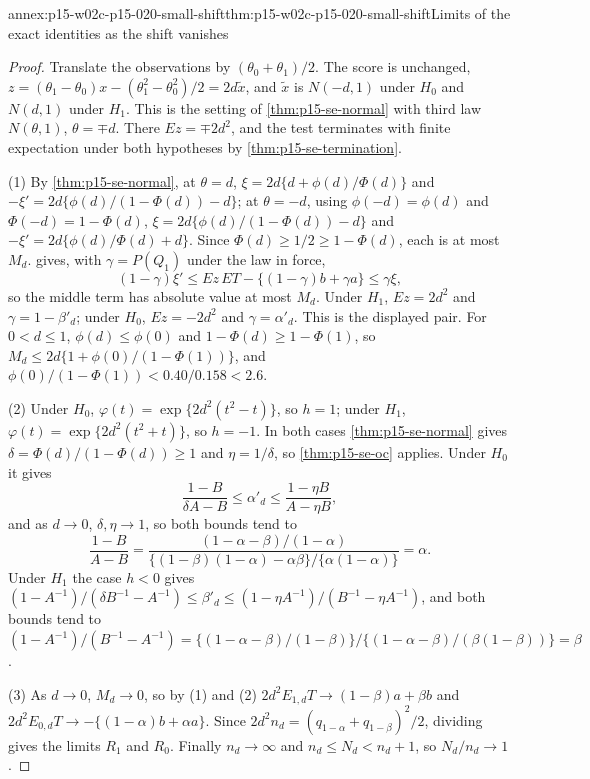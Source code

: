 \begin{annexitem}{annex:p15-w02c-p15-020-small-shift}{thm:p15-w02c-p15-020-small-shift}{Limits of the exact identities as the shift vanishes}
\begin{proof}
Translate the observations by \((\theta_0+\theta_1)/2\). The score is
unchanged, \(z=(\theta_1-\theta_0)x-(\theta_1^2-\theta_0^2)/2=2d\tilde x\),
and \(\tilde x\) is \(N(-d,1)\) under \(H_0\) and \(N(d,1)\) under
\(H_1\). This is the setting of \cref{thm:p15-se-normal} with third law
\(N(\theta,1)\), \(\theta=\mp d\). There \(Ez=\mp2d^2\), and the test
terminates with finite expectation under both hypotheses by
\cref{thm:p15-se-termination}.

(1) By \cref{thm:p15-se-normal}, at \(\theta=d\),
\(\xi=2d\{d+\phi(d)/\Phi(d)\}\) and \(-\xi'=2d\{\phi(d)/(1-\Phi(d))-d\}\);
at \(\theta=-d\), using \(\phi(-d)=\phi(d)\) and
\(\Phi(-d)=1-\Phi(d)\), \(\xi=2d\{\phi(d)/(1-\Phi(d))-d\}\) and
\(-\xi'=2d\{\phi(d)/\Phi(d)+d\}\). Since \(\Phi(d)\geq1/2\geq1-\Phi(d)\),
each is at most \(M_d\).  gives, with
\(\gamma=P(Q_1)\) under the law in force,
\[
 (1-\gamma)\xi'\leq Ez\,ET-\{(1-\gamma)b+\gamma a\}\leq\gamma\xi,
\]
so the middle term has absolute value at most \(M_d\). Under \(H_1\),
\(Ez=2d^2\) and \(\gamma=1-\beta'_d\); under \(H_0\), \(Ez=-2d^2\) and
\(\gamma=\alpha'_d\). This is the displayed pair. For \(0<d\leq1\),
\(\phi(d)\leq\phi(0)\) and \(1-\Phi(d)\geq1-\Phi(1)\), so
\(M_d\leq2d\{1+\phi(0)/(1-\Phi(1))\}\), and
\(\phi(0)/(1-\Phi(1))<0.40/0.158<2.6\).

(2) Under \(H_0\), \(\varphi(t)=\exp\{2d^2(t^2-t)\}\), so \(h=1\); under
\(H_1\), \(\varphi(t)=\exp\{2d^2(t^2+t)\}\), so \(h=-1\). In both cases
\cref{thm:p15-se-normal} gives \(\delta=\Phi(d)/(1-\Phi(d))\geq1\) and
\(\eta=1/\delta\), so \cref{thm:p15-se-oc} applies. Under \(H_0\) it
gives
\[
 \frac{1-B}{\delta A-B}\leq\alpha'_d\leq\frac{1-\eta B}{A-\eta B},
\]
and as \(d\to0\), \(\delta,\eta\to1\), so both bounds tend to
\[
 \frac{1-B}{A-B}
 =\frac{(1-\alpha-\beta)/(1-\alpha)}{\{(1-\beta)(1-\alpha)-\alpha\beta\}/\{\alpha(1-\alpha)\}}
 =\alpha .
\]
Under \(H_1\) the case \(h<0\) gives
\((1-A^{-1})/(\delta B^{-1}-A^{-1})\leq\beta'_d\leq(1-\eta A^{-1})/(B^{-1}-\eta A^{-1})\),
and both bounds tend to
\((1-A^{-1})/(B^{-1}-A^{-1})
=\{(1-\alpha-\beta)/(1-\beta)\}\big/\{(1-\alpha-\beta)/(\beta(1-\beta))\}=\beta\).

(3) As \(d\to0\), \(M_d\to0\), so by (1) and (2)
\(2d^2E_{1,d}T\to(1-\beta)a+\beta b\) and
\(2d^2E_{0,d}T\to-\{(1-\alpha)b+\alpha a\}\). Since
\(2d^2n_d=(q_{1-\alpha}+q_{1-\beta})^2/2\), dividing gives the limits
\(R_1\) and \(R_0\). Finally \(n_d\to\infty\) and
\(n_d\leq N_d<n_d+1\), so \(N_d/n_d\to1\).


\end{proof}
\end{annexitem}
